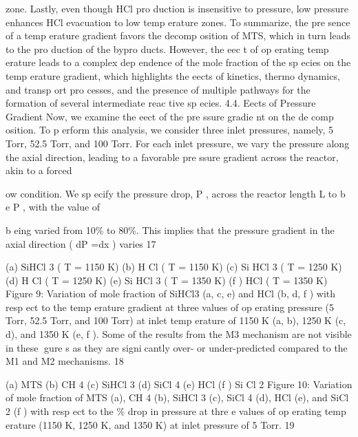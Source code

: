 \documentclass[10pt, letterpaper]{article}
\begin{document}
zone. Lastly, even though HCl pro duction is insensitive to pressure, low pressure enhances HCl evacuation
to low temp erature zones.
To summarize, the pre sence of a temp erature gradient favors the decomp osition of MTS, which in turn
leads to the pro duction of the bypro ducts. However, the eec t of op erating temp erature leads to a complex
dep endence of the mole fraction of the sp ecies on the temp erature gradient, which highlights the eects of
kinetics, thermo dynamics, and transp ort pro cesses, and the presence of multiple pathways for the formation
of several intermediate reac tive sp ecies.
4.4. Eects of Pressure Gradient
Now, we examine the eect of the pre ssure gradie nt on the de comp osition. To p erform this analysis, we
consider three inlet pressures, namely, 5 Torr, 52.5 Torr, and 100 Torr. For each inlet pressure, we vary the
pressure along the axial direction, leading to a favorable pre ssure gradient across the reactor, akin to a forced

ow condition. We sp ecify the pressure drop, 
P
, across the reactor length
L
to b e
 P
, with the value of

b eing varied from 10\% to 80\%. This implies that the pressure gradient in the axial direction (
dP =dx
) varies
17


(a) SiHCl
3
(
T
= 1150 K)
(b) H Cl (
T
= 1150 K)
(c) Si HCl
3
(
T
= 1250 K)
(d) H Cl (
T
= 1250 K)
(e) Si HCl
3
(
T
= 1350 K)
(f ) HCl (
T
= 1350 K)
Figure 9: Variation of mole fraction of SiHCl3 (a, c, e) and HCl (b, d, f ) with resp ect to the temp erature gradient at three values
of op erating pressure (5 Torr, 52.5 Torr, and 100 Torr) at inlet temp erature of 1150 K (a, b), 1250 K (c, d), and 1350 K (e, f ).
Some of the results from the M3 mechanism are not visible in these gure s as they are signicantly over- or under-predicted
compared to the M1 and M2 mechanisms.
18


(a) MTS
(b) CH
4
(c) SiHCl
3
(d) SiCl
4
(e) HCl
(f ) Si Cl
2
Figure 10: Variation of mole fraction of MTS (a), CH
4
(b), SiHCl
3
(c), SiCl
4
(d), HCl (e), and SiCl
2
(f ) with resp ect to the \%
drop in pressure at thre e values of op erating temp erature (1150 K, 1250 K, and 1350 K) at inlet pressure of 5 Torr.
19
\end{document}
